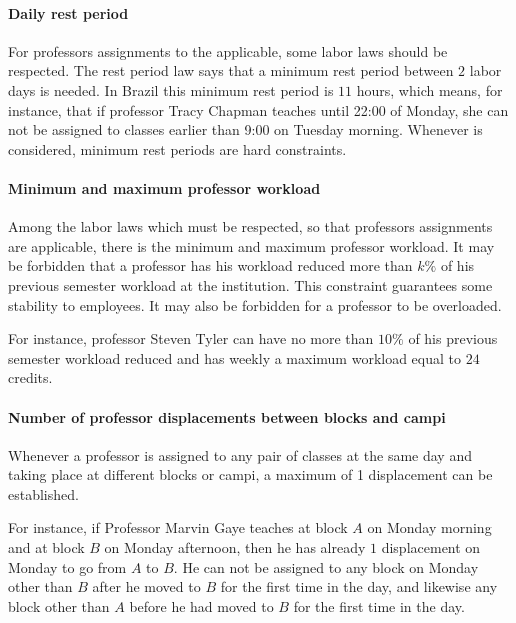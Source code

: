\paragraph{Daily rest period}
\label{constrrestperiod}

For professors assignments to the applicable, some labor laws should be respected. The rest period law says that a minimum rest period between $2$ labor days is needed. In Brazil this minimum rest period is $11$ hours, which means, for instance, that if professor Tracy Chapman teaches until 22:00 of Monday, she can not be assigned to classes earlier than 9:00 on Tuesday morning. Whenever is considered, minimum rest periods are hard constraints.


\paragraph{Minimum and maximum professor workload}
\label{constrminmaxworkload}

Among the labor laws which must be respected, so that professors assignments are applicable, there is the minimum and maximum professor workload. It may be forbidden that a professor has his workload reduced more than $k\%$ of his previous semester workload at the institution. This constraint guarantees some stability to employees. It may also be forbidden for a professor to be overloaded.

For instance, professor Steven Tyler can have no more than $10\%$ of his previous semester workload reduced and has weekly a maximum workload equal to $24$ credits.


\paragraph{Number of professor displacements between blocks and campi}
\label{constrprofdisplacnum}

Whenever a professor is assigned to any pair of classes at the same day and taking place at different blocks or campi, a maximum of 1 displacement can be established.

For instance, if Professor Marvin Gaye teaches at block $A$ on Monday morning and at block $B$ on Monday afternoon, then he has already $1$ displacement on Monday to go from $A$ to $B$. He can not be assigned to any block on Monday other than $B$ after he moved to $B$ for the first time in the day, and likewise any block other than $A$ before he had moved to $B$ for the first time in the day.

